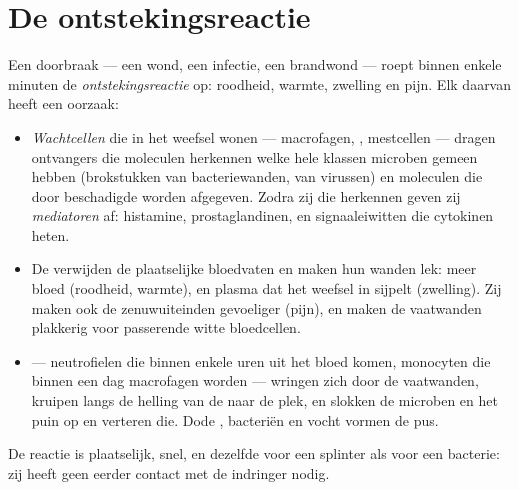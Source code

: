 \section{De ontstekingsreactie}

\begin{proposition}\label{prop:g12:innate-immunity:inflammation}
Een doorbraak --- een wond, een infectie, een brandwond --- roept binnen
enkele minuten de \emph{ontstekingsreactie} op: roodheid,
warmte, zwelling en pijn. Elk daarvan heeft een oorzaak:
\begin{itemize}
  \item \emph{Wachtcellen} die in het weefsel wonen --- macrofagen,
        , mestcellen --- dragen ontvangers die
        moleculen herkennen welke hele klassen microben gemeen hebben
        (brokstukken van bacteriewanden,  van virussen) en
        moleculen die door beschadigde  worden afgegeven. Zodra zij
        die herkennen geven zij
        \emph{mediatoren} af: histamine,
        prostaglandinen, en signaaleiwitten die cytokinen heten.
  \item De  verwijden de plaatselijke bloedvaten en maken hun
        wanden lek: meer bloed (roodheid, warmte), en plasma dat het
        weefsel in sijpelt (zwelling). Zij maken ook de zenuwuiteinden
        gevoeliger (pijn), en maken de vaatwanden plakkerig voor
        passerende witte bloedcellen.
  \item \emph{} --- neutrofielen die binnen enkele uren uit het
        bloed komen, monocyten die binnen een dag macrofagen worden ---
        wringen zich door de vaatwanden, kruipen langs de helling van de
         naar de plek, en slokken de microben en het puin op en
        verteren die. Dode , bacteriën en vocht vormen de pus.
\end{itemize}
De reactie is plaatselijk, snel, en dezelfde voor een splinter als voor
een bacterie: zij heeft geen eerder contact met de indringer nodig.
\end{proposition}
